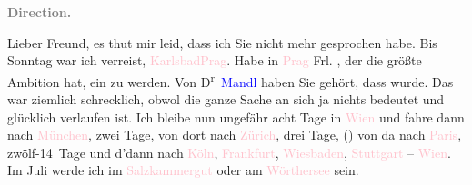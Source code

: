 \pstart
           \textcolor{gray}{\textbf{Direction.}}\pend
           
\pstart
           Lieber Freund, es thut mir leid, dass ich Sie nicht mehr gesprochen
               habe. Bis Sonntag war ich verreist, \textcolor{pink}{Karlsbad}{}\ledrightnote{\textcolor{pink}{Karlsbad}}{ }\textcolor{pink}{Prag}{}\ledrightnote{\textcolor{pink}{Prag}}. Habe in \textcolor{pink}{Prag}{}\ledrightnote{\textcolor{pink}{Prag}} Frl. \label{K_L03313-1v}\label{K_L03313-1h}, der die größte Ambition hat, ein \label{K_L03313-2v}\label{K_L03313-2h} zu werden. Von D\textsuperscript{r} \textcolor{blue}{Mandl}{}\ledrightnote{\textcolor{blue}{Irene Mandl}} haben Sie gehört, dass \label{K_L03313-3v}\label{K_L03313-3h} wurde. Das war ziemlich
               schrecklich, obwol die ganze Sache an sich ja nichts bedeutet und glücklich verlaufen
               ist. Ich bleibe nun ungefähr acht Tage in \textcolor{pink}{Wien}{}\ledrightnote{\textcolor{pink}{Wien}} und
               fahre dann nach \textcolor{pink}{München}{}\ledrightnote{\textcolor{pink}{München}}, zwei Tage, von dort
               nach \textcolor{pink}{Zürich}{}\ledrightnote{\textcolor{pink}{Zürich}}, drei Tage, (\label{K_L03313-4v}\label{K_L03313-4h}) von da nach \textcolor{pink}{Paris}{}\ledrightnote{\textcolor{pink}{Paris}}, zwölf-14 Tage und
               d’dann nach \textcolor{pink}{Köln}{}\ledrightnote{\textcolor{pink}{Köln}}, \textcolor{pink}{Frankfurt}{}\ledrightnote{\textcolor{pink}{Frankfurt am Main}}, \textcolor{pink}{Wiesbaden}{}\ledrightnote{\textcolor{pink}{Wiesbaden}}, \textcolor{pink}{Stuttgart}{}\ledrightnote{\textcolor{pink}{Stuttgart}} – \textcolor{pink}{Wien}{}\ledrightnote{\textcolor{pink}{Wien}}. Im Juli werde ich im \textcolor{pink}{Salzkammergut}{}\ledrightnote{\textcolor{pink}{Salzkammergut}} oder am \textcolor{pink}{Wörthersee}{}\ledrightnote{\textcolor{pink}{Wörthersee}} sein.
